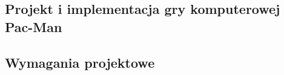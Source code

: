 \documentclass{iiuwb}
\begin{document}
\begin{itemize}





\chapter{Projekt i implementacja gry komputerowej Pac-Man}


\section{Wymagania projektowe}

\end{itemize}
\end{document}
